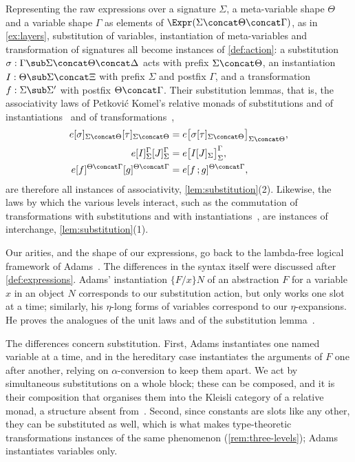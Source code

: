 \begin{remark}\label{rem:three-levels}
    Representing the raw expressions over a signature $\Sigma$, a meta-variable shape $\Theta$ and a variable shape $\Gamma$ as elements of $\Expr(\Sigma \concat \Theta \concat \Gamma)$, as in \cref{ex:layers}, substitution of variables, instantiation of meta-variables and transformation of signatures all become instances of \cref{def:action}: a substitution $\sigma : \Gamma \sub \Sigma \concat \Theta \concat \Delta$ acts with prefix $\Sigma \concat \Theta$, an instantiation $I : \Theta \sub \Sigma \concat \Xi$ with prefix $\Sigma$ and postfix $\Gamma$, and a transformation $f : \Sigma \sub \Sigma'$ with postfix $\Theta \concat \Gamma$. Their substitution lemmas, that is, the associativity laws of Petković Komel's relative monads of substitutions and of instantiations~\cite[\S\S7.2 and~7.3]{PetkovicKomel2021} and of transformations~\cite[Lemma~8.3.4]{PetkovicKomel2021},
    \begin{align*}
        e[\sigma]_{\Sigma \concat \Theta}[\tau]_{\Sigma \concat \Theta} &= e\big[\sigma[\tau]_{\Sigma \concat \Theta}\big]_{\Sigma \concat \Theta},\\
        e[I]_\Sigma^\Gamma[J]_\Sigma^\Gamma &= e\big[I[J]_\Sigma\big]_\Sigma^\Gamma,\\
        e[f]^{\Theta \concat \Gamma}[g]^{\Theta \concat \Gamma} &= e[f \,; g]^{\Theta \concat \Gamma},
    \end{align*}
    are therefore all instances of associativity, \cref{lem:substitution}(2). Likewise, the laws by which the various levels interact, such as the commutation of transformations with substitutions and with instantiations~\cite[Lemmas~8.3.2 and~8.3.3]{PetkovicKomel2021}, are instances of interchange, \cref{lem:substitution}(1).
\end{remark}

\begin{remark}\label{rem:adams}
    Our arities, and the shape of our expressions, go back to the lambda-free logical framework of Adams~\cite{Adams2008}. The differences in the syntax itself were discussed after \cref{def:expressions}. Adams' instantiation $\{F/x\}N$ of an abstraction $F$ for a variable $x$ in an object $N$ corresponds to our substitution action, but only works one slot at a time; similarly, his $\eta$-long forms of variables correspond to our $\eta$-expansions. He proves the analogues of the unit laws and of the substitution lemma~\cite[Lemmas~3.3 and~3.4]{Adams2008}.
    
    The differences concern substitution. First, Adams instantiates one named variable at a time, and in the hereditary case instantiates the arguments of $F$ one after another, relying on $\alpha$-conversion to keep them apart. We act by simultaneous substitutions on a whole block; these can be composed, and it is their composition that organises them into the Kleisli category of a relative monad, a structure absent from~\cite{Adams2008}. Second, since constants are slots like any other, they can be substituted as well, which is what makes type-theoretic transformations instances of the same phenomenon (\cref{rem:three-levels}); Adams instantiates variables only.
\end{remark}

